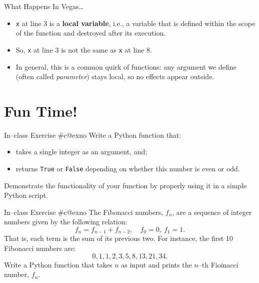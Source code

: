 \documentclass[aspectratio=169, 12pt, xcolor=table]{beamer}
\makeatletter
\newcommand{\arabicthree}[1]{\expandafter\@arabicthree\csname c@#1\endcsname}
\newcommand{\@arabicthree}[1]{\ifnum #1<100 0\fi\ifnum #1<10 0\fi\number#1}
\newcounter{exno}
\newcommand{\exno}{\stepcounter{exno}In--class Exercise \#\arabicthree{exno}}
\makeatother
\begin{document}
	\begin{frame}{What Happens In Vegas\ldots}
		\begin{minipage}[t]{0.58\textwidth}
			\vspace{0pt}
			\begin{itemize}
				\item \texttt{x} at line 3 is a \textbf{local variable}, i.e., a variable that is defined within the scope of the function and destroyed after its execution.
				\item So, \texttt{x} at line 3 is not the same as \texttt{x} at line 8.
				\item In general, this is a common quirk of functions: any argument we define (often called \textit{parameter}) stays local, so no effects appear outside.
			\end{itemize}
		\end{minipage}\hfill
		\begin{minipage}[t]{0.38\textwidth}
			\vspace{0pt}
			
		\end{minipage}
	\end{frame}
	
	\section{Fun Time!}\label{sec:fun-time}
	
	\sectionframe
	
	\setcounter{exno}{0}
	
	\begin{frame}{\exno}
		Write a Python function that:
		\begin{itemize}
			\item takes a single integer as an argument, and;
			\item returns \texttt{True} or \texttt{False} depending on whether this number is even or odd.
		\end{itemize}
		Demonstrate the functionality of your function by properly using it in a simple Python script.
	\end{frame}

	\begin{frame}{\exno}
		The Fibonacci numbers, $f_n$, are a sequence of integer numbers given by the following relation:
		\[f_n=f_{n-1}+f_{n-2},\quad f_0=0,\ f_1=1.\]
		That is, each term is the sum of its previous two. For instance, the first 10 Fibonacci numbers are:
		\[0,1,1,2,3,5,8,13,21,34.\]
		Write a Python function that takes $n$ as input and prints the $n$--th Fioinacci number, $f_n$.
	\end{frame}
\end{document}
